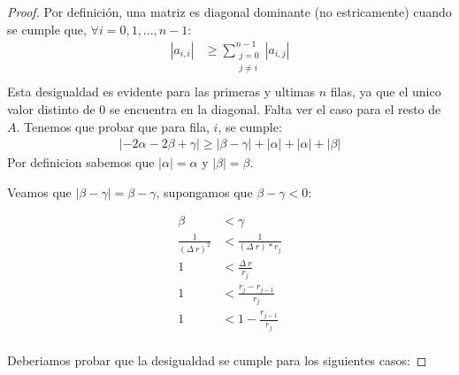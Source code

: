   \begin{proof}
    Por definición, una matriz es diagonal dominante (no estricamente) cuando se cumple que, $\forall i = 0,1,...,n-1$:
    \begin{equation*}
        \begin{aligned}
          |a_{i,i}| &\geq \sum\limits_{\substack{j=0  \\ j \neq i}}^{n-1} |a_{i,j}| \\
        \end{aligned}
    \end{equation*}
    Esta desigualdad es evidente para las primeras  y ultimas $n$ filas, ya que el unico valor distinto de 0 se encuentra en la diagonal.
    Falta ver el caso para el resto de $A$. Tenemos que probar que para fila, $i$, se cumple:
    \begin{equation*}
        \begin{aligned}
          |-2\alpha-2\beta+\gamma| \geq |\beta - \gamma| + |\alpha| + |\alpha| + |\beta|
        \end{aligned}
    \end{equation*}
    Por definicion sabemos que $|\alpha| = \alpha$ y $|\beta| = \beta$.  
    
    Veamos que $|\beta - \gamma| = \beta - \gamma$, supongamos que $\beta - \gamma < 0$:
    
    \begin{equation*}
        \begin{aligned}
          \beta &< \gamma \\
          \frac{1}{(\Delta\ r)^2}  &< \frac{1}{(\Delta\ r) * r_{j}} \\
          1 &< \frac{\Delta\ r}{r_{j}} \\
          1 &< \frac{r_{j} - r_{j-1}}{r_{j}} \\
          1 &< 1 - \frac{r_{j-1}}{r_{j}} \\
        \end{aligned}
    \end{equation*}

    Deberiamos probar que la desigualdad se cumple para los siguientes casos:


\end{proof}
